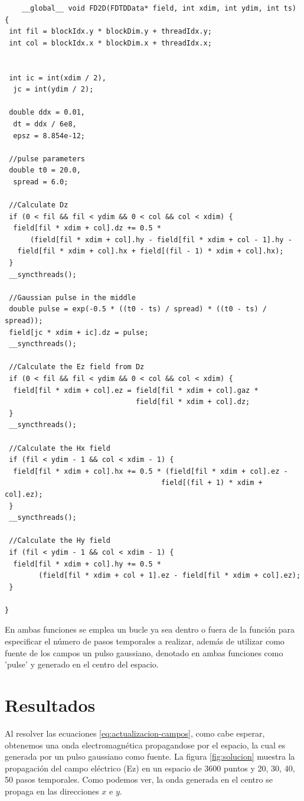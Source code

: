 \documentclass[11pt,a4paper,twoside,pdf]{article}
\numberwithin{equation}{section}
\begin{document}
\begin{verbatim}
    __global__ void FD2D(FDTDData* field, int xdim, int ydim, int ts)
{
 int fil = blockIdx.y * blockDim.y + threadIdx.y;
 int col = blockIdx.x * blockDim.x + threadIdx.x;


 int ic = int(xdim / 2),
  jc = int(ydim / 2);

 double ddx = 0.01,
  dt = ddx / 6e8,
  epsz = 8.854e-12;

 //pulse parameters
 double t0 = 20.0,
  spread = 6.0;

 //Calculate Dz
 if (0 < fil && fil < ydim && 0 < col && col < xdim) {
  field[fil * xdim + col].dz += 0.5 * 
      (field[fil * xdim + col].hy - field[fil * xdim + col - 1].hy -
   field[fil * xdim + col].hx + field[(fil - 1) * xdim + col].hx);
 }
 __syncthreads();

 //Gaussian pulse in the middle
 double pulse = exp(-0.5 * ((t0 - ts) / spread) * ((t0 - ts) / spread));
 field[jc * xdim + ic].dz = pulse;
 __syncthreads();

 //Calculate the Ez field from Dz
 if (0 < fil && fil < ydim && 0 < col && col < xdim) {
  field[fil * xdim + col].ez = field[fil * xdim + col].gaz * 
                               field[fil * xdim + col].dz;
 }
 __syncthreads();

 //Calculate the Hx field
 if (fil < ydim - 1 && col < xdim - 1) {
  field[fil * xdim + col].hx += 0.5 * (field[fil * xdim + col].ez - 
                                     field[(fil + 1) * xdim + col].ez);
 }
 __syncthreads();

 //Calculate the Hy field
 if (fil < ydim - 1 && col < xdim - 1) {
  field[fil * xdim + col].hy += 0.5 * 
        (field[fil * xdim + col + 1].ez - field[fil * xdim + col].ez);
 }

}
\end{verbatim}

En ambas funciones se emplea un bucle ya sea dentro o fuera de la función para especificar el número de pasos temporales a realizar, además de utilizar como fuente de los campos un pulso gaussiano, denotado en ambas funciones como 'pulse' y generado en el centro del espacio.





\section{Resultados}

Al resolver las ecuaciones \ref{eq:actualizacion-campos}, como cabe esperar, obtenemos una onda electromagnética propagandose por el espacio, la cual es generada por un pulso gaussiano como fuente. La figura \ref{fig:solucion} muestra la propagación del campo eléctrico (Ez) en un espacio de 3600 puntos y 20, 30, 40, 50 pasos temporales. Como podemos ver, la onda generada en el centro se propaga en las direcciones $x$ e $y$.  
\end{document}
